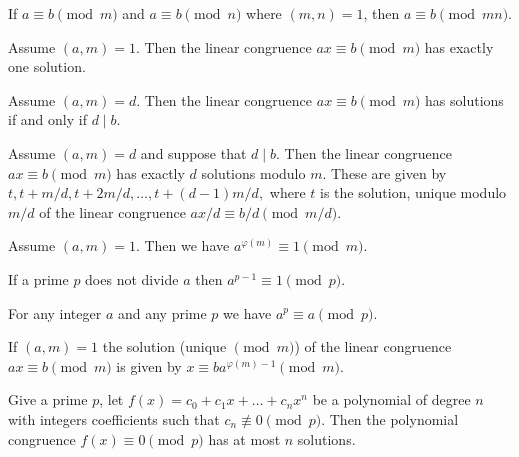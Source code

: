 \begin{theorem}
    If $a \equiv b \pmod{m}$ and $a \equiv b \pmod{n}$
    where $(m, n) = 1$, then $a \equiv b \pmod{mn}$.
\end{theorem}

\begin{theorem}
    Assume $(a, m) = 1$. Then the linear congruence
    $ax \equiv b \pmod{m}$ has exactly one solution.
\end{theorem}

\begin{theorem}
    Assume $(a, m) = d$. Then the linear congruence
    $ax \equiv b \pmod{m}$ has solutions if and only
    if $d \mid b$.
\end{theorem}

\begin{theorem}
    Assume $(a, m) = d$ and suppose that $d \mid b$.
    Then the linear congruence $ax \equiv b \pmod{m}$
    has exactly $d$ solutions modulo $m$. These are given by
    $t, t + m/d, t + 2m/d, \dots, t + (d - 1)m/d,$
    where $t$ is the solution, unique modulo $m/d$ of the
    linear congruence $ax/d \equiv b/d \pmod{m/d}$.
\end{theorem}

\begin{theorem}
    Assume $(a, m) = 1$. Then we have
    $a^{\varphi(m)} \equiv 1 \pmod{m}$.
\end{theorem}

\begin{theorem}
    If a prime $p$ does not divide $a$ then
    $a^{p - 1} \equiv 1 \pmod{p}$.
\end{theorem}

\begin{theorem}
    For any integer $a$ and any prime $p$ we have
    $a^p \equiv a \pmod{p}$.
\end{theorem}

\begin{theorem}
    If $(a, m) = 1$ the solution (unique $\pmod{m}$)
    of the linear congruence
    $ax \equiv b \pmod{m}$
    is given by
    $x \equiv b a^{\varphi(m) - 1} \pmod{m}$.
\end{theorem}

\begin{theorem}[Lagrange]
    Give a prime $p$, let
    $f(x) = c_0 + c_1 x + \dots + c_n x^n$
    be a polynomial of degree $n$ with integers coefficients such that
    $c_n \not\equiv 0 \pmod{p}$.
    Then the polynomial congruence
    $f(x) \equiv 0 \pmod{p}$
    has at most $n$ solutions.
\end{theorem}

